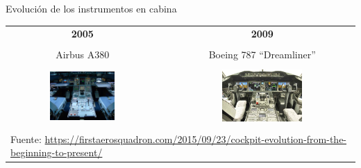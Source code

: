 \begin{frame}{Evoluci\'on de los instrumentos en cabina}
  
  \begin{tabular}{ccc}
    {\bf \large 2005} & & {\bf \large 2009} \\ & & \\
	{Airbus A380} & & {Boeing 787 ``Dreamliner'' } \\ & & \\
    \includegraphics[width=0.45\textwidth]{imagenes/1.1.introduccion/A380_Cockpit_2.jpg}
	& \hspace{5mm}
	&\includegraphics[width=0.45\textwidth]{imagenes/1.1.introduccion/019-boeing-787.jpg} \\ & & \\
	\multicolumn{3}{l}{
	{\tiny Fuente: \url{https://firstaerosquadron.com/2015/09/23/cockpit-evolution-from-the-beginning-to-present/}}
}
	\\
  \end{tabular}

\end{frame}
